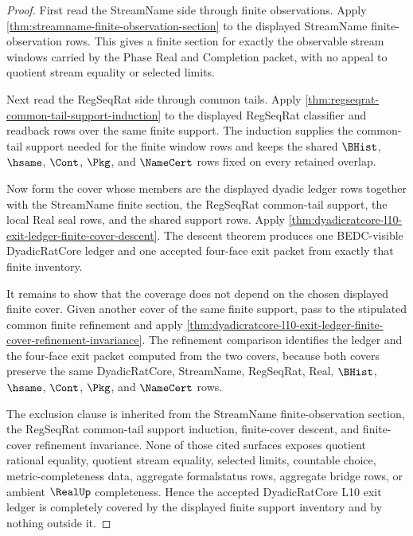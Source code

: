 \begin{proof}
First read the StreamName side through finite observations. Apply \autoref{thm:streamname-finite-observation-section} to the displayed StreamName finite-observation rows. This gives a finite section for exactly the observable stream windows carried by the Phase Real and Completion packet, with no appeal to quotient stream equality or selected limits.

Next read the RegSeqRat side through common tails. Apply \autoref{thm:regseqrat-common-tail-support-induction} to the displayed RegSeqRat classifier and readback rows over the same finite support. The induction supplies the common-tail support needed for the finite window rows and keeps the shared $\BHist$, $\hsame$, $\Cont$, $\Pkg$, and $\NameCert$ rows fixed on every retained overlap.

Now form the cover whose members are the displayed dyadic ledger rows together with the StreamName finite section, the RegSeqRat common-tail support, the local Real seal rows, and the shared support rows. Apply \autoref{thm:dyadicratcore-l10-exit-ledger-finite-cover-descent}. The descent theorem produces one BEDC-visible DyadicRatCore ledger and one accepted four-face exit packet from exactly that finite inventory.

It remains to show that the coverage does not depend on the chosen displayed finite cover. Given another cover of the same finite support, pass to the stipulated common finite refinement and apply \autoref{thm:dyadicratcore-l10-exit-ledger-finite-cover-refinement-invariance}. The refinement comparison identifies the ledger and the four-face exit packet computed from the two covers, because both covers preserve the same DyadicRatCore, StreamName, RegSeqRat, Real, $\BHist$, $\hsame$, $\Cont$, $\Pkg$, and $\NameCert$ rows.

The exclusion clause is inherited from the StreamName finite-observation section, the RegSeqRat common-tail support induction, finite-cover descent, and finite-cover refinement invariance. None of those cited surfaces exposes quotient rational equality, quotient stream equality, selected limits, countable choice, metric-completeness data, aggregate formalstatus rows, aggregate bridge rows, or ambient $\RealUp$ completeness. Hence the accepted DyadicRatCore L10 exit ledger is completely covered by the displayed finite support inventory and by nothing outside it.
\end{proof}

